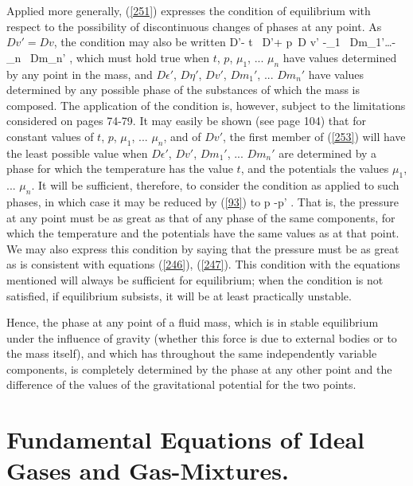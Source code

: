\documentclass[12pt]{article}
\begin{document}
Applied more generally, (\ref{251}) expresses the condition of equilibrium with respect to the possibility of discontinuous changes of phases at any point. As $Dv'= Dv$, the condition may also be written
\eqs D\epsilon'- t \, D\eta'+ p \,D v' -\mu_1 \, Dm_1'\dots - \mu_n \, Dm_n' , \label{253}\eqe
which must hold true when $t$, $p$, $\mu_1$, ... $\mu_n$ have values determined by any point in the mass, and $D\epsilon'$, $D\eta'$, $Dv'$, $Dm_1'$, ... $Dm_n'$ have values determined by any possible phase of the substances of which the mass is composed. The application of the condition is, however, subject to the limitations considered on pages 74-79. It may easily be shown (see page 104) that for constant values of $t$, $p$, $\mu_1$, ... $\mu_n$, and of $Dv'$, the first member of (\ref{253}) will have the least possible value when $D\epsilon'$, $Dv'$, $Dm_1'$, ... $Dm_n'$ are determined by a phase for which the temperature has the value $t$, and the potentials the values $\mu_1$, ... $\mu_n$. It will be sufficient, therefore, to consider the condition as applied to such phases, in which case it may be reduced by (\ref{93}) to
\eqs p -p' . \label{254}\eqe
That is, the pressure at any point must be as great as that of any phase of the same components, for which the temperature and the potentials have the same values as at that point. We may also express this condition by saying that the pressure must be as great as is consistent with equations (\ref{246}), (\ref{247}). This condition with the equations mentioned will always be sufficient for equilibrium; when the condition is not satisfied, if equilibrium subsists, it will be at least practically unstable.


Hence, the phase at any point of a fluid mass, which is in stable equilibrium under the influence of gravity (whether this force is due to external bodies or to the mass itself), and which has throughout the same independently variable components, is completely determined by the phase at any other point and the difference of the values of the gravitational potential for the two points.


\section{Fundamental Equations of Ideal Gases and Gas-Mixtures.}
\end{document}
